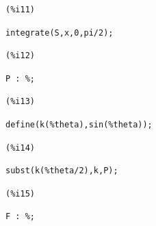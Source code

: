 \documentclass[12pt]{article}
\begin{document}
\noindent
\begin{minipage}[t]{8ex}{\color{red}\bf
\begin{verbatim}
(%i11) 
\end{verbatim}}
\end{minipage}
\begin{minipage}[t]{\textwidth}{\color{blue}
\begin{verbatim}
integrate(S,x,0,pi/2);
\end{verbatim}}
\end{minipage}

\noindent
\begin{minipage}[t]{8ex}{\color{red}\bf
\begin{verbatim}
(%i12) 
\end{verbatim}}
\end{minipage}
\begin{minipage}[t]{\textwidth}{\color{blue}
\begin{verbatim}
P : %;
\end{verbatim}}
\end{minipage}

\noindent
\begin{minipage}[t]{8ex}{\color{red}\bf
\begin{verbatim}
(%i13) 
\end{verbatim}}
\end{minipage}
\begin{minipage}[t]{\textwidth}{\color{blue}
\begin{verbatim}
define(k(%theta),sin(%theta));
\end{verbatim}}
\end{minipage}

\noindent
\begin{minipage}[t]{8ex}{\color{red}\bf
\begin{verbatim}
(%i14) 
\end{verbatim}}
\end{minipage}
\begin{minipage}[t]{\textwidth}{\color{blue}
\begin{verbatim}
subst(k(%theta/2),k,P);
\end{verbatim}}
\end{minipage}

\noindent
\begin{minipage}[t]{8ex}{\color{red}\bf
\begin{verbatim}
(%i15) 
\end{verbatim}}
\end{minipage}
\begin{minipage}[t]{\textwidth}{\color{blue}
\begin{verbatim}
F : %;
\end{verbatim}}
\end{minipage}
\end{document}
